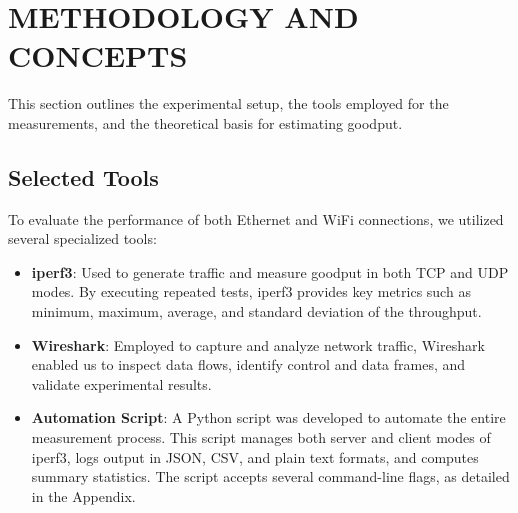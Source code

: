 
\section{METHODOLOGY AND CONCEPTS} \label{sec:methodology-and-concepts}


    This section outlines the experimental setup, the tools employed for the measurements, and the theoretical basis for estimating goodput.

    \subsection{Selected Tools} \label{subsec:selected-tools}

        To evaluate the performance of both Ethernet and WiFi connections, we utilized several specialized tools:

        \begin{itemize}
            \item \textbf{iperf3}: Used to generate traffic and measure goodput in both TCP and UDP modes. By executing repeated tests, iperf3 provides key metrics such as minimum, maximum, average, and standard deviation of the throughput.
            \item \textbf{Wireshark}: Employed to capture and analyze network traffic, Wireshark enabled us to inspect data flows, identify control and data frames, and validate experimental results.
            \item \textbf{Automation Script}: A Python script was developed to automate the entire measurement process. This script manages both server and client modes of iperf3, logs output in JSON, CSV, and plain text formats, and computes summary statistics. 
                The script accepts several command-line flags, as detailed in the Appendix. %
        \end{itemize}

